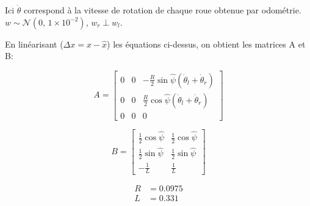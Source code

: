 \documentclass[addpoints]{exam}
\begin{document}
\begin{questions}
Ici $\dot{\theta}$ correspond à la vitesse de rotation de chaque roue obtenue par odométrie. $w \sim \mathcal{N}(0,\,1\times10^{-2})$, $w_r \perp w_l$.\vspace{3mm}

En linéarisant ($\Delta x = x-\hat{x}$) les équations ci-dessus, on obtient les matrices A et B:

\begin{equation}
    A = \begin{bmatrix}
        0 & 0 & -\frac{R}{2}\sin{\hat{\psi}}(\dot{\theta}_l+\dot{\theta}_r)\\
        0 & 0 & \frac{R}{2}\cos{\hat{\psi}}(\dot{\theta}_l+\dot{\theta}_r)\\
        0 & 0 & 0
        \end{bmatrix}
\end{equation}

\begin{equation}
    B = \begin{bmatrix}
        \frac{1}{2}\cos{\hat{\psi}} & \frac{1}{2}\cos{\hat{\psi}} \\
        \frac{1}{2}\sin{\hat{\psi}} & \frac{1}{2}\sin{\hat{\psi}} \\
        -\frac{1}{L} & \frac{1}{L} 
        \end{bmatrix}
\end{equation}

\begin{align}
    \nonumber R &= 0.0975\\
    \nonumber L &= 0.331
\end{align}


\end{questions}
\end{document}
